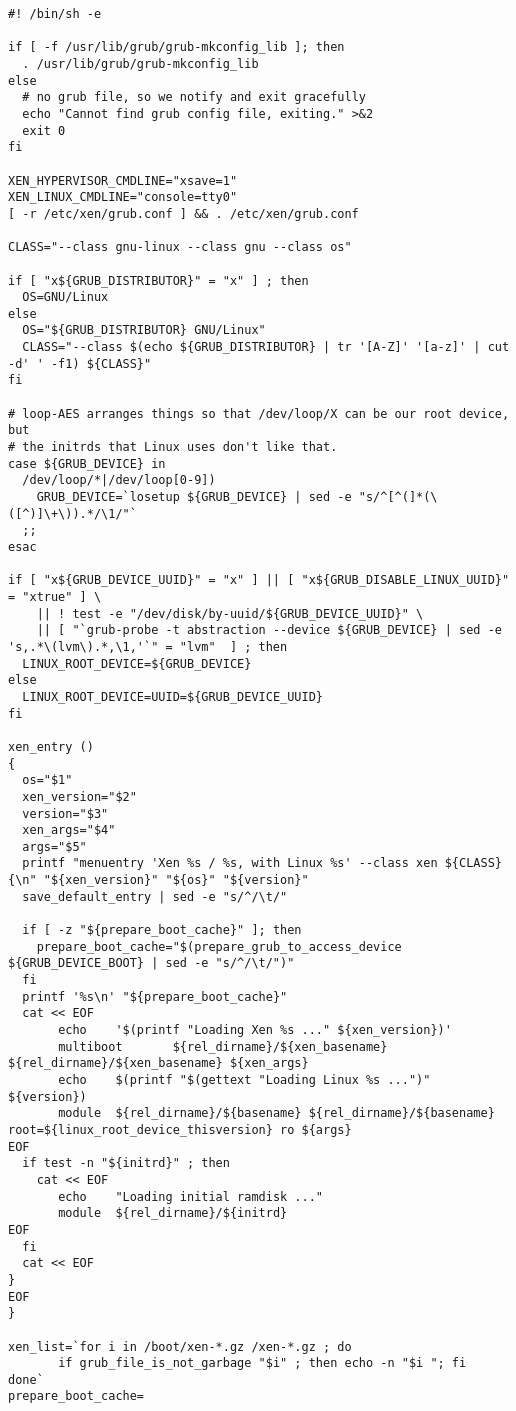 \begin{lstlisting}
#! /bin/sh -e

if [ -f /usr/lib/grub/grub-mkconfig_lib ]; then
  . /usr/lib/grub/grub-mkconfig_lib
else
  # no grub file, so we notify and exit gracefully
  echo "Cannot find grub config file, exiting." >&2
  exit 0
fi

XEN_HYPERVISOR_CMDLINE="xsave=1"
XEN_LINUX_CMDLINE="console=tty0"
[ -r /etc/xen/grub.conf ] && . /etc/xen/grub.conf

CLASS="--class gnu-linux --class gnu --class os"

if [ "x${GRUB_DISTRIBUTOR}" = "x" ] ; then
  OS=GNU/Linux
else
  OS="${GRUB_DISTRIBUTOR} GNU/Linux"
  CLASS="--class $(echo ${GRUB_DISTRIBUTOR} | tr '[A-Z]' '[a-z]' | cut -d' ' -f1) ${CLASS}"
fi

# loop-AES arranges things so that /dev/loop/X can be our root device, but
# the initrds that Linux uses don't like that.
case ${GRUB_DEVICE} in
  /dev/loop/*|/dev/loop[0-9])
    GRUB_DEVICE=`losetup ${GRUB_DEVICE} | sed -e "s/^[^(]*(\([^)]\+\)).*/\1/"`
  ;;
esac

if [ "x${GRUB_DEVICE_UUID}" = "x" ] || [ "x${GRUB_DISABLE_LINUX_UUID}" = "xtrue" ] \
    || ! test -e "/dev/disk/by-uuid/${GRUB_DEVICE_UUID}" \
    || [ "`grub-probe -t abstraction --device ${GRUB_DEVICE} | sed -e 's,.*\(lvm\).*,\1,'`" = "lvm"  ] ; then
  LINUX_ROOT_DEVICE=${GRUB_DEVICE}
else
  LINUX_ROOT_DEVICE=UUID=${GRUB_DEVICE_UUID}
fi

xen_entry ()
{
  os="$1"
  xen_version="$2"
  version="$3"
  xen_args="$4"
  args="$5"
  printf "menuentry 'Xen %s / %s, with Linux %s' --class xen ${CLASS} {\n" "${xen_version}" "${os}" "${version}"
  save_default_entry | sed -e "s/^/\t/"

  if [ -z "${prepare_boot_cache}" ]; then
    prepare_boot_cache="$(prepare_grub_to_access_device ${GRUB_DEVICE_BOOT} | sed -e "s/^/\t/")"
  fi
  printf '%s\n' "${prepare_boot_cache}"
  cat << EOF
       echo    '$(printf "Loading Xen %s ..." ${xen_version})'
       multiboot       ${rel_dirname}/${xen_basename} ${rel_dirname}/${xen_basename} ${xen_args}
       echo    $(printf "$(gettext "Loading Linux %s ...")" ${version})
       module  ${rel_dirname}/${basename} ${rel_dirname}/${basename} root=${linux_root_device_thisversion} ro ${args}
EOF
  if test -n "${initrd}" ; then
    cat << EOF
       echo    "Loading initial ramdisk ..."
       module  ${rel_dirname}/${initrd}
EOF
  fi
  cat << EOF
}
EOF
}

xen_list=`for i in /boot/xen-*.gz /xen-*.gz ; do
       if grub_file_is_not_garbage "$i" ; then echo -n "$i "; fi
done`
prepare_boot_cache=


\end{lstlisting}
